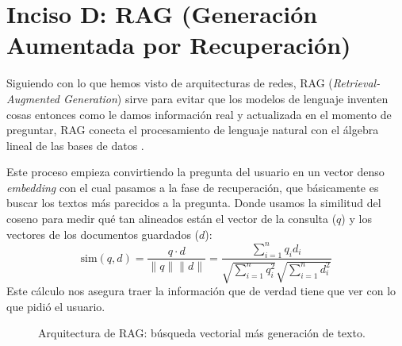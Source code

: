 \section{Inciso D: RAG (Generación Aumentada por Recuperación)}

Siguiendo con lo que hemos visto de arquitecturas de redes, RAG (\textit{Retrieval-Augmented Generation}) sirve para evitar que los modelos de lenguaje inventen cosas entonces como le damos información real y actualizada en el momento de preguntar, RAG conecta el procesamiento de lenguaje natural con el álgebra lineal de las bases de datos \cite{cite40}.

Este proceso empieza convirtiendo la pregunta del usuario en un vector denso \textit{embedding} con el cual pasamos a la fase de recuperación, que básicamente es buscar los textos más parecidos a la pregunta. Donde usamos la similitud del coseno para medir qué tan alineados están el vector de la consulta ($q$) y los vectores de los documentos guardados ($d$):
\begin{equation}
    \text{sim}(q, d) = \frac{q \cdot d}{\|q\| \|d\|} = \frac{\sum_{i=1}^{n} q_i d_i}{\sqrt{\sum_{i=1}^{n} q_i^2} \sqrt{\sum_{i=1}^{n} d_i^2}}
\end{equation}
Este cálculo nos asegura traer la información que de verdad tiene que ver con lo que pidió el usuario.

\begin{figure}[H]
    \centering
    \caption{Arquitectura de RAG: búsqueda vectorial más generación de texto.}
\end{figure}

